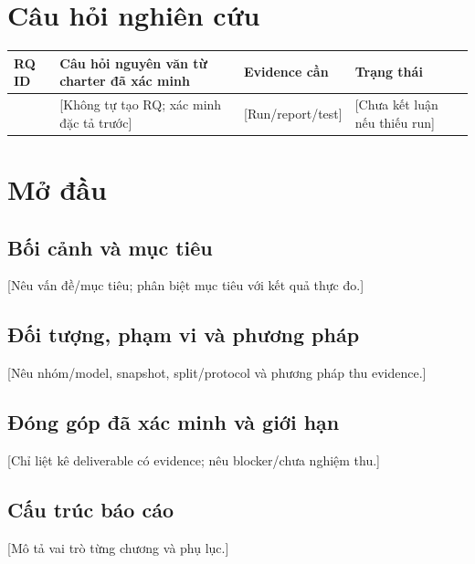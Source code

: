 \chapter*{Câu hỏi nghiên cứu}
\begin{longtable}{p{}p{}p{}p{}}
\toprule RQ ID & Câu hỏi nguyên văn từ charter đã xác minh & Evidence cần & Trạng thái \\
\midrule
[RQ ID] & [Không tự tạo RQ; xác minh đặc tả trước] & [Run/report/test] & [Chưa kết luận nếu thiếu run] \\
\bottomrule
\end{longtable}

\chapter*{Mở đầu}
\section*{Bối cảnh và mục tiêu}
[Nêu vấn đề/mục tiêu; phân biệt mục tiêu với kết quả thực đo.]

\section*{Đối tượng, phạm vi và phương pháp}
[Nêu nhóm/model, snapshot, split/protocol và phương pháp thu evidence.]

\section*{Đóng góp đã xác minh và giới hạn}
[Chỉ liệt kê deliverable có evidence; nêu blocker/chưa nghiệm thu.]

\section*{Cấu trúc báo cáo}
[Mô tả vai trò từng chương và phụ lục.]